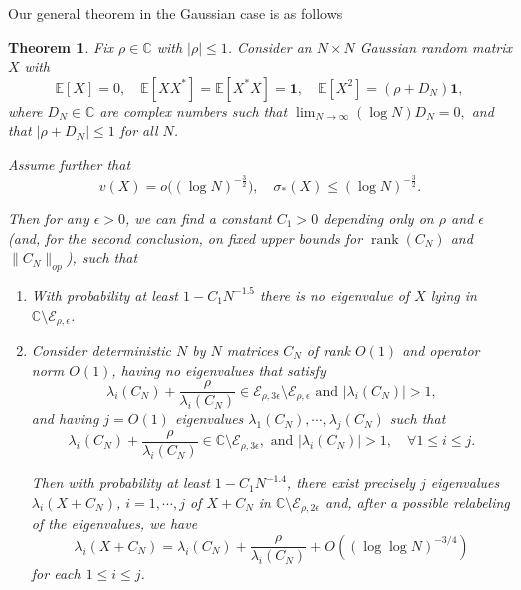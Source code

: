 \documentclass[11pt,reqno]{amsart}
\theoremstyle{plain}
\newtheorem{theorem}{Theorem}[section]
\theoremstyle{remark}
\numberwithin{equation}{section}
\begin{document}
Our general theorem in the Gaussian case is as follows
\begin{theorem}\label{gaussianmastertheorem} Fix $\rho\in\mathbb{C}$ with $|\rho|\leq 1$.
    Consider an $N
    \times N$ Gaussian random matrix $X$ with \begin{equation}\label{regularityconditions}\mathbb{E}[X]=0,\quad \mathbb{E}[XX^*]=\mathbb{E}[X^*X]=\mathbf{1},\quad \mathbb{E}[X^2]=(\rho+D_N)\mathbf{1},\end{equation} where $D_N\in\mathbb{C}$ are complex numbers such that $\lim_{N\to\infty}(\log N)D_N=0,$ and that $|\rho+D_N|\leq 1$ for all $N$. 
    
    
    Assume further that \begin{equation}\label{smallness}v(X)=o\big((\log N)^{-\frac{3}{2}}\big),\quad \sigma_*(X)\leq (\log N)^{-\frac{3}{2}}.\end{equation} 
    
    
    Then for any $\epsilon>0$, we can 
 find a constant $C_1>0$ depending only on $\rho$ and $\epsilon$ (and, for the second conclusion, on fixed upper bounds for $\operatorname{rank}(C_N)$ and $\|C_N\|_{op}$), such that
    \begin{enumerate}
        \item 
    With probability at least $1-C_1N^{-1.5}$ there is no eigenvalue of $X$ lying in $\mathbb{C}\setminus\mathcal{E}_{\rho,\epsilon}$.
\item Consider deterministic $N$ by $N$ matrices $C_N$ of rank $O(1)$ and operator norm $O(1)$, having no eigenvalues that satisfy 
$$
\lambda_i(C_N)+\frac{\rho}{\lambda_i(C_N)}\in\mathcal{E}_{\rho,3\epsilon}\setminus\mathcal{E}_{\rho,\epsilon}\text{ and } |\lambda_i(C_N)|>1,
$$
and having $j=O(1)$ eigenvalues $\lambda_1(C_N),\cdots,\lambda_j(C_N)$ such that $$\lambda_i(C_N)+\frac{\rho}{\lambda_i(C_N)}\in\mathbb{C}\setminus\mathcal{E}_{\rho,3\epsilon},\text{ and }|\lambda_i(C_N)|> 1,\quad\forall 1\leq i\leq j.$$ 

Then with probability at least $1-C_1N^{-1.4}$, there exist precisely $j$ eigenvalues $\lambda_i(X+C_N)$, $i=1,\cdots,j$ of $X+C_N$ in $\mathbb{C}\setminus\mathcal{E}_{\rho,2\epsilon}$ and, after a possible relabeling of the eigenvalues, we have $$\lambda_i(X+C_N)=\lambda_i(C_N)+\frac{\rho}{\lambda_i(C_N)}+O((\log\log N)^{-3/4})$$ for each $1\leq i\leq j$.
\end{enumerate} 

 
\end{theorem}
\end{document}

